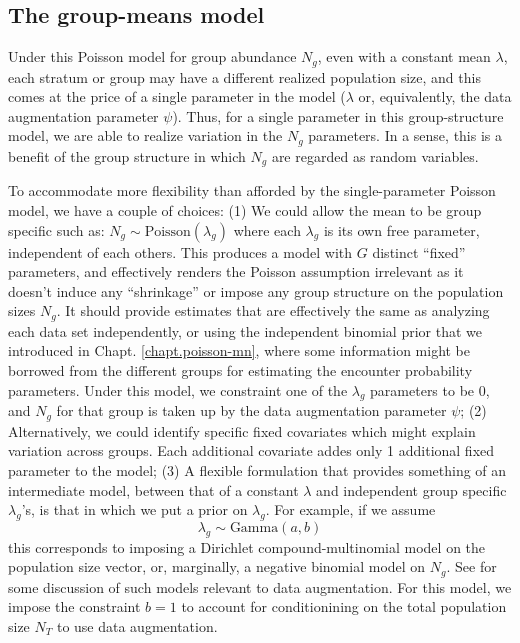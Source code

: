 \subsection{The group-means model}

Under this Poisson model for group abundance $N_g$, even with a constant mean $\lambda$, each
stratum or group may have a different realized population size, and
this comes at the price of a single parameter in the model ($\lambda$
or, equivalently, the data augmentation parameter $\psi$).
Thus,
for a single parameter in this group-structure model, we are
able to realize variation in the $N_{g}$ parameters. In a sense, this
is a benefit of the group structure in which $N_{g}$ are regarded as
random variables.

To accommodate more
flexibility than afforded by the single-parameter Poisson model, we
have a couple of choices: (1) We could allow the mean to be group specific such as:
$N_g \sim \mbox{Poisson}(\lambda_{g})$ where each $\lambda_{g}$ is its own
free parameter, independent of each others. This produces a model with
$G$ distinct ``fixed'' parameters, and effectively renders
the Poisson assumption irrelevant as it doesn't induce any
``shrinkage''
or impose any group structure on the
population sizes $N_{g}$. It should provide estimates that are
effectively the same as analyzing each data set independently, or
using the independent binomial prior that we introduced in
Chapt. \ref{chapt.poisson-mn}, where some information might be
borrowed from the different groups for estimating the encounter
probability parameters.
Under this model, we constraint one of the $\lambda_{g}$ parameters
to be 0, and $N_{g}$ for that group is taken up by the data
augmentation parameter $\psi$; (2) Alternatively, we could identify
specific fixed covariates which might explain variation across
groups. Each additional covariate addes only 1 additional fixed
parameter to the model; (3)
A flexible formulation that provides something of an intermediate model,
between that of a constant $\lambda$ and independent group specific
$\lambda_{g}$'s, is that in which we put a prior on $\lambda_{g}$. For
example, if we assume
\[
 \lambda_{g} \sim \mbox{Gamma}(a,b)
\]
this corresponds to imposing a Dirichlet compound-multinomial
model on the population size vector, or, marginally, a negative
binomial model on $N_{g}$. See \citet{takemura:1999} for some
discussion of such models relevant to data augmentation.  For this
model, we impose the constraint $b=1$ to account for conditionining on
the total population size $N_{T}$ to use data augmentation.


